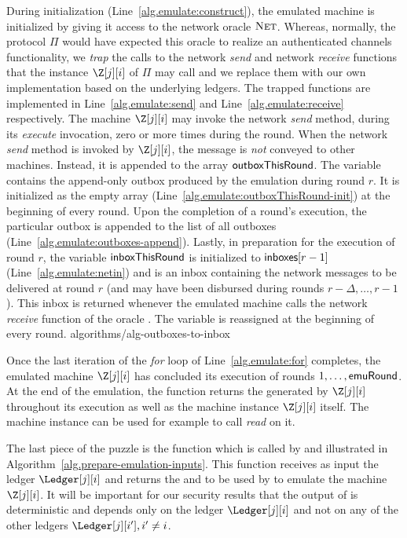 During initialization (Line~\ref{alg.emulate:construct}),
the emulated machine is
initialized by giving it access to the network oracle $\textsc{Net}$.
Whereas, normally, the protocol $\Pi$ would have expected this
oracle to realize an authenticated channels functionality, we
\emph{trap} the calls to the network \emph{send} and network
\emph{receive} functions that the instance $\Z[j][i]$ of $\Pi$
may call and we replace them with our own implementation based on
the underlying ledgers. The trapped functions are implemented
in Line~\ref{alg.emulate:send} and Line~\ref{alg.emulate:receive}
respectively. The machine $\Z[j][i]$ may invoke the network
\emph{send} method, during its \emph{execute} invocation, zero
or more times during the round. When the network \emph{send} method
is invoked by $\Z[j][i]$, the message is \emph{not} conveyed
to other machines. Instead, it is appended to the array
$\textsf{outboxThisRound}$. The variable contains the append-only
outbox produced by the emulation during round $r$. It is
initialized as the empty array
(Line~\ref{alg.emulate:outboxThisRound-init}) at the beginning
of every round. Upon the completion of a round's execution,
the particular outbox is appended to the list of all outboxes
(Line~\ref{alg.emulate:outboxes-append}).
Lastly, in preparation for the execution of round $r$,
the variable $\textsf{inboxThisRound}$ is initialized to
$\textsf{inboxes}[r - 1]$ (Line~\ref{alg.emulate:netin})
and is an inbox containing the network messages to be
delivered at round $r$ (and may have been disbursed during
rounds $r - \Delta, \ldots, r - 1$). This inbox is returned
whenever the emulated machine calls the network \emph{receive}
function of the oracle \net. The variable \inboxThisRound
is reassigned at the beginning of every round.
{algorithms/alg-outboxes-to-inbox}

Once the last iteration of the \emph{for} loop of Line~\ref{alg.emulate:for} completes,
the emulated machine $\Z[j][i]$ has concluded its execution of rounds $1, \ldots, \allowbreak \textsf{emuRound}$.
At the end of the emulation, the \emulate function returns the \outboxes generated by
$\Z[j][i]$ throughout its execution as well as the machine instance $\Z[j][i]$ itself.
The machine instance can be used for example to call \emph{read} on it.

The last piece of the puzzle is the \prepareEmulationInputs function which is
called by \emulate and illustrated in Algorithm~\ref{alg.prepare-emulation-inputs}. This function receives as input the ledger $\Ledger[j][i]$ and
returns the \writeboxes and \inboxes to be used by \emulate to emulate the machine $\Z[j][i]$. It will be important for
our security results that the output of \prepareEmulationInputs is deterministic
and depends only on the ledger $\Ledger[j][i]$ and not on any of the other ledgers $\Ledger[j][i'], i' \neq i$.

